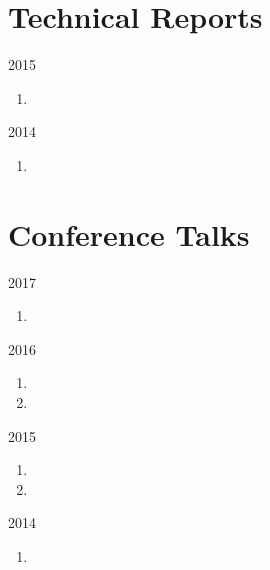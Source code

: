 \section*{Technical Reports}

\begin{paracol}{2}
  \textsc{2015}
\switchcolumn
  \begin{enumerate}
    \setcounter{enumi}{\thepubcounter}
    \item {}
    \setcounter{pubcounter}{\theenumi}
  \end{enumerate}
\end{paracol}

\begin{paracol}{2}
  \textsc{2014}
\switchcolumn
  \begin{enumerate}
    \setcounter{enumi}{\thepubcounter}
    \item {}
    \setcounter{pubcounter}{\theenumi}
  \end{enumerate}
\end{paracol}

\section*{Conference Talks}

\begin{paracol}{2}
  \textsc{2017}
\switchcolumn
  \begin{enumerate}
    \setcounter{enumi}{\thepubcounter}
    \item {}
    \setcounter{pubcounter}{\theenumi}
  \end{enumerate}
\end{paracol}

\begin{paracol}{2}
  \textsc{2016}
\switchcolumn
  \begin{enumerate}
    \setcounter{enumi}{\thepubcounter}
    \item {}
    \item {}
    \setcounter{pubcounter}{\theenumi}
  \end{enumerate}
\end{paracol}

\begin{paracol}{2}
  \textsc{2015}
\switchcolumn
  \begin{enumerate}
    \setcounter{enumi}{\thepubcounter}
    \item {}
    \item {}
    \setcounter{pubcounter}{\theenumi}
  \end{enumerate}
\end{paracol}

\begin{paracol}{2}
  \textsc{2014}
\switchcolumn
  \begin{enumerate}
    \setcounter{enumi}{\thepubcounter}
    \item {}
    \setcounter{pubcounter}{\theenumi}
  \end{enumerate}
\end{paracol}
